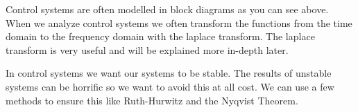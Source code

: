 Control systems are often modelled in block diagrams as you can see above. When we analyze control systems we often transform the functions from the time domain to the frequency domain with the laplace transform. The laplace transform is very useful and will be explained more in-depth later.



In control systems we want our systems to be stable. The results of unstable systems can be horrific so we want to avoid this at all cost. We can use a few methods to ensure this like Ruth-Hurwitz and the Nyqvist Theorem.





